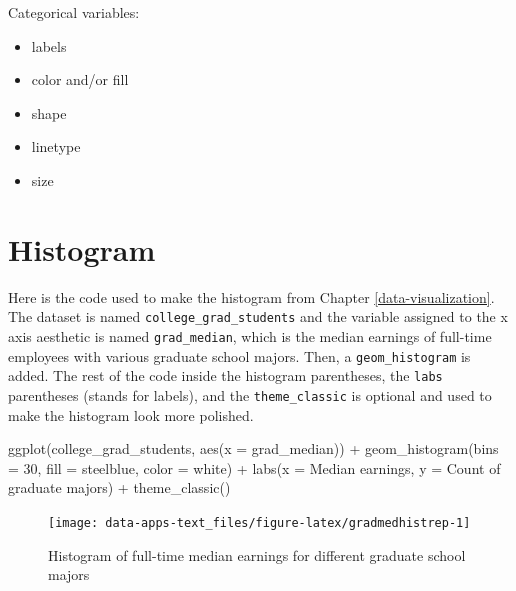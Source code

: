 \documentclass[
]{book}
\makeatletter
\newenvironment{Shaded}{\begin{snugshade}}{\end{snugshade}}
\newcommand{\AttributeTok}[1]{\textcolor[rgb]{0.61,0.61,0.61}{#1}}
\newcommand{\DecValTok}[1]{\textcolor[rgb]{0.06,0.06,0.06}{#1}}
\newcommand{\FunctionTok}[1]{\textcolor[rgb]{0,0,0}{#1}}
\newcommand{\NormalTok}[1]{#1}
\newcommand{\SpecialCharTok}[1]{\textcolor[rgb]{0,0,0}{#1}}
\newcommand{\StringTok}[1]{\textcolor[rgb]{0.5,0.5,0.5}{#1}}
\providecommand{\tightlist}{%
  \setlength{\itemsep}{0pt}\setlength{\parskip}{0pt}}
\newenvironment{kframe}{%
\medskip{}
\setlength{\fboxsep}{.8em}
 \def\at@end@of@kframe{}%
 \ifinner\ifhmode%
  \def\at@end@of@kframe{\end{minipage}}%
  \begin{minipage}{\columnwidth}%
 \fi\fi%
 \def\FrameCommand##1{\hskip\@totalleftmargin \hskip-\fboxsep
 \colorbox{shadecolor}{##1}\hskip-\fboxsep
     \hskip-\linewidth \hskip-\@totalleftmargin \hskip\columnwidth}%
 \MakeFramed {\advance\hsize-\width
   \@totalleftmargin\z@ \linewidth\hsize
   \@setminipage}}%
 {\par\unskip\endMakeFramed%
 \at@end@of@kframe}
\renewenvironment{Shaded}{\begin{kframe}}{\end{kframe}}
\makeatother
\begin{document}
Categorical variables:

\begin{itemize}
\tightlist
\item
  labels
\item
  color and/or fill
\item
  shape
\item
  linetype
\item
  size
\end{itemize}

\hypertarget{histogram}{%
\section{Histogram}\label{histogram}}

Here is the code used to make the histogram from Chapter \ref{data-visualization}. The dataset is named \texttt{college\_grad\_students} and the variable assigned to the x axis aesthetic is named \texttt{grad\_median}, which is the median earnings of full-time employees with various graduate school majors. Then, a \texttt{geom\_histogram} is added. The rest of the code inside the histogram parentheses, the \texttt{labs} parentheses (stands for labels), and the \texttt{theme\_classic} is optional and used to make the histogram look more polished.

\begin{Shaded}
\begin{Highlighting}[]
\FunctionTok{ggplot}\NormalTok{(college\_grad\_students, }\FunctionTok{aes}\NormalTok{(}\AttributeTok{x =}\NormalTok{ grad\_median)) }\SpecialCharTok{+}
  \FunctionTok{geom\_histogram}\NormalTok{(}\AttributeTok{bins =} \DecValTok{30}\NormalTok{, }\AttributeTok{fill =} \StringTok{\textquotesingle{}steelblue\textquotesingle{}}\NormalTok{, }\AttributeTok{color =} \StringTok{\textquotesingle{}white\textquotesingle{}}\NormalTok{) }\SpecialCharTok{+}
  \FunctionTok{labs}\NormalTok{(}\AttributeTok{x =} \StringTok{\textquotesingle{}Median earnings\textquotesingle{}}\NormalTok{, }\AttributeTok{y =} \StringTok{\textquotesingle{}Count of graduate majors\textquotesingle{}}\NormalTok{) }\SpecialCharTok{+}
  \FunctionTok{theme\_classic}\NormalTok{()}
\end{Highlighting}
\end{Shaded}

\begin{figure}

{\centering \texttt{[image: data-apps-text\_files/figure-latex/gradmedhistrep-1]} 

}

\caption{Histogram of full-time median earnings for different graduate school majors}\label{fig:gradmedhistrep}
\end{figure}
\end{document}
